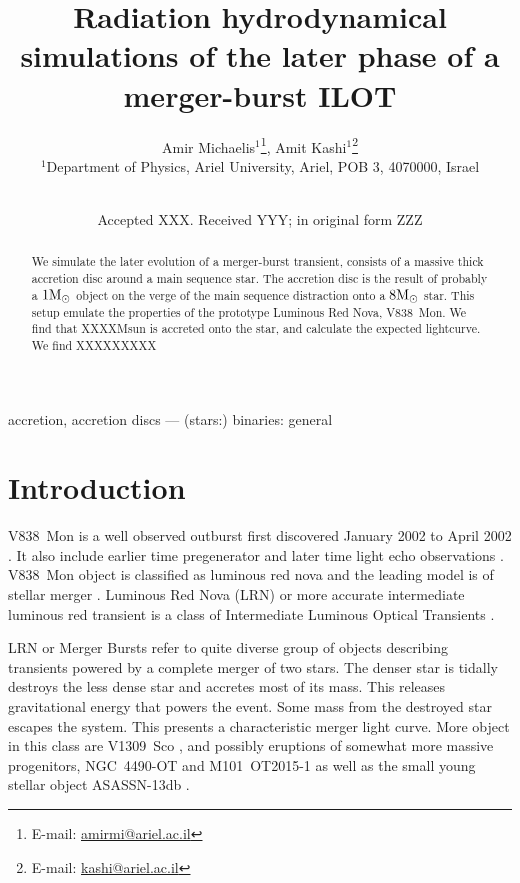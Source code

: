 \documentclass[a4paper,fleqn,usenatbib,useAMS]{mnras}
\title[V838Mon 2002 eruption as an ILOT]{Radiation hydrodynamical simulations of the later phase of a merger-burst ILOT}
\author[A. Michaelis et al.]{
Amir Michaelis$^{1}$\thanks{E-mail: \href{mailto:amirmi@ariel.ac.il}{amirmi@ariel.ac.il}},
Amit Kashi$^{1}$\thanks{E-mail: \href{mailto:kashi@ariel.ac.il}{kashi@ariel.ac.il}}
\\
$^{1}$Department of Physics, Ariel University, Ariel, POB 3, 4070000, Israel \\
\\
}
\date{Accepted XXX. Received YYY; in original form ZZZ}
\begin{document}
\label{firstpage}
\pagerange{\pageref{firstpage}--\pageref{lastpage}}
\maketitle
\begin{abstract}
We simulate the later evolution of a merger-burst transient, consists of a massive thick accretion disc around a main sequence star.
The accretion disc is the result of probably a $1\mathrm{M}_\odot$ object on the verge of the main sequence distraction onto a $8\mathrm{M}_\odot$ star.
This setup emulate the properties of the prototype Luminous Red Nova, V838~Mon.
We find that XXXXMsun is accreted onto the star, and calculate the expected lightcurve.
We find XXXXXXXXX
\end{abstract}

\begin{keywords}
accretion, accretion discs --- (stars:) binaries: general
\end{keywords}

\section{Introduction}
\label{sec:intro}
V838~Mon is a well observed outburst first discovered January 2002 \citep{2002IAUC.7785....1B} to April 2002 \citep{2005A&A...436.1009T}.
It also include earlier time pregenerator \citep{2005A&A...441.1099T} and later time light echo observations \citep[for example][]{2018A&A...617A.129K}.
V838~Mon object is classified as luminous red nova and the leading model is of stellar merger \citep{2006A&A...451..223T,2014MNRAS.443.1319K,2015A&A...580A..34K,2016MNRAS.458..950S,2018A&A...617A.129K}.
Luminous Red Nova (LRN) or more accurate intermediate luminous red transient is a class of Intermediate Luminous Optical Transients \citep[ILOTs; recently also refereed to as ``Sokers'',][]{2016RAA....16...99K}.

LRN or Merger Bursts refer to quite diverse group of objects describing transients powered by a complete merger of two stars. 
The denser star is tidally destroys the less dense star and accretes most of its mass. This releases gravitational energy that powers the event. Some mass from the destroyed star escapes the system.
This presents a characteristic merger light curve. More object in this class are V1309~Sco \citep{2011A&A...528A.114T}, and possibly eruptions of somewhat more massive progenitors, NGC~4490-OT \citep{2016MNRAS.458..950S} and M101~OT2015-1 \citep{2017ApJ...834..107B} as well as the small young stellar object ASASSN-13db \citep{2019arXiv191207305K}.
\end{document}
